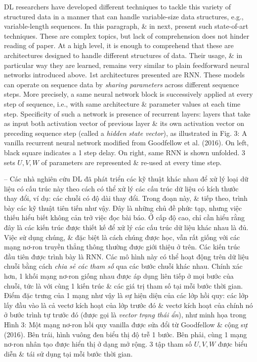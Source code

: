 \documentclass{article}
\begin{document}
\begin{itemize}
\begin{itemize}
\begin{itemize}
            DL researchers have developed different techniques to tackle this variety of structured data in a manner that can handle variable-size data structures, e.g., variable-length sequences. In this paragraph, \& in next, present such state-of-art techniques. These are complex topics, but lack of comprehension does not hinder reading of paper. At a high level, it is enough to comprehend that these are architectures designed to handle different structures of data. Their usage, \& in particular way they are learned, remains very similar to plain feedforward neural networks introduced above. 1st architectures presented are RNN. These models can operate on sequence data by {\it sharing parameters} across different sequence steps. More precisely, a same neural network block is successively applied at every step of sequence, i.e., with same architecture \& parameter values at each time step. Specificity of such a network is presence of recurrent layers: layers that take as input both activation vector of previous layer \& its own activation vector on preceding sequence step (called a {\it hidden state vector}), as illustrated in {\sf Fig. 3: A vanilla recurrent neural network modiﬁed from Goodfellow et al. (2016). On left, black square indicates a 1 step delay. On right, same RNN is shown unfolded. 3 sets $U,V,W$ of parameters are represented \& re-used at every time step.}

            -- Các nhà nghiên cứu DL đã phát triển các kỹ thuật khác nhau để xử lý loại dữ liệu có cấu trúc này theo cách có thể xử lý các cấu trúc dữ liệu có kích thước thay đổi, ví dụ: các chuỗi có độ dài thay đổi. Trong đoạn này, \& tiếp theo, trình bày các kỹ thuật tiên tiến như vậy. Đây là những chủ đề phức tạp, nhưng việc thiếu hiểu biết không cản trở việc đọc bài báo. Ở cấp độ cao, chỉ cần hiểu rằng đây là các kiến trúc được thiết kế để xử lý các cấu trúc dữ liệu khác nhau là đủ. Việc sử dụng chúng, \& đặc biệt là cách chúng được học, vẫn rất giống với các mạng nơ-ron truyền thẳng thông thường được giới thiệu ở trên. Các kiến trúc đầu tiên được trình bày là RNN. Các mô hình này có thể hoạt động trên dữ liệu chuỗi bằng cách {\it chia sẻ các tham số} qua các bước chuỗi khác nhau. Chính xác hơn, 1 khối mạng nơ-ron giống nhau được áp dụng liên tiếp ở mọi bước của chuỗi, tức là với cùng 1 kiến trúc \& các giá trị tham số tại mỗi bước thời gian. Điểm đặc trưng của 1 mạng như vậy là sự hiện diện của các lớp hồi quy: các lớp lấy đầu vào là cả vectơ kích hoạt của lớp trước đó \& vectơ kích hoạt của chính nó ở bước trình tự trước đó (được gọi là {\it vector trạng thái ẩn}), như minh họa trong {\sf Hình 3: Một mạng nơ-ron hồi quy vanilla được sửa đổi từ Goodfellow \& cộng sự (2016). Bên trái, hình vuông đen biểu thị độ trễ 1 bước. Bên phải, cùng 1 mạng nơ-ron nhân tạo được hiển thị ở dạng mở rộng. 3 tập tham số $U,V,W$ được biểu diễn \& tái sử dụng tại mỗi bước thời gian.}


\end{itemize}
\end{itemize}
\end{itemize}
\end{document}
